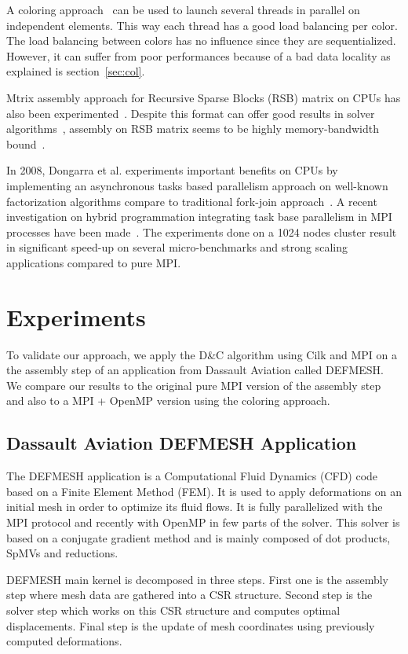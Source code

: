 \documentclass{IOS-Book-Article}
\begin{document}
A coloring approach~\cite{CUDAfe,CPUfe} can be used to launch several threads in parallel on independent elements.
This way each thread has a good load balancing per color. The load balancing between colors has no influence since they are sequentialized.
However, it can suffer from poor performances because of a bad data locality as explained is section~\ref{sec:col}.

Mtrix assembly approach for Recursive Sparse Blocks (RSB) matrix on CPUs has also been experimented~\cite{RSBasm}. Despite this format can offer good results in solver algorithms~\cite{RSBsolver}, assembly on RSB matrix seems to be highly memory-bandwidth bound~\cite{RSBasm}.

In 2008, Dongarra et al. experiments important benefits on CPUs by implementing an asynchronous tasks based parallelism approach on well-known factorization algorithms
compare to traditional fork-join approach~\cite{Dongarra}.
A recent investigation on hybrid programmation integrating task base parallelism in MPI processes have been made~\cite{MPIhybid}.
The experiments done on a 1024 nodes cluster result in significant speed-up on several micro-benchmarks and strong scaling applications compared to pure MPI.

\section{Experiments}
To validate our approach, we apply the D\&C algorithm using Cilk and MPI on a the assembly step of an application from Dassault Aviation called DEFMESH.
We compare our results to the original pure MPI version of the assembly step and also to a MPI + OpenMP version using the coloring approach.

\subsection{Dassault Aviation DEFMESH Application}
The DEFMESH application is a Computational Fluid Dynamics (CFD) code based on a Finite Element Method (FEM).
It is used to apply deformations on an initial mesh in order to optimize its fluid flows.
It is fully parallelized with the MPI protocol and recently with OpenMP in few parts of the solver.
This solver is based on a conjugate gradient method and is mainly composed of dot products, SpMVs and reductions.

DEFMESH main kernel is decomposed in three steps.
First one is the assembly step where mesh data are gathered into a CSR structure.
Second step is the solver step which works on this CSR structure and computes optimal displacements.
Final step is the update of mesh coordinates using previously computed deformations.
\end{document}
